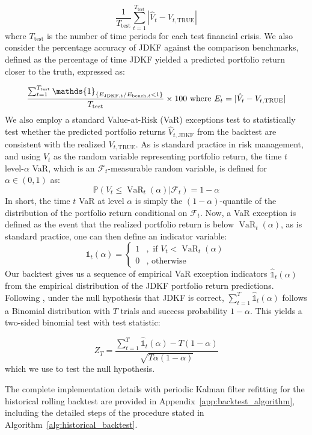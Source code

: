 \documentclass[11pt]{article}
\theoremstyle{plain}
\theoremstyle{definition}
\theoremstyle{remark}
\numberwithin{equation}{section}
\begin{document}
\[\frac{1}{T_{\text{test}}}\sum_{t=1}^{T_{\text{test}}} |\hat{V}_t-V_{t, \mathrm{TRUE}}| \]
where $T_{\text{test}}$ is the number of time periods for each test financial crisis. We also consider the percentage accuracy of JDKF against the comparison benchmarks, defined as the percentage of time JDKF yielded a predicted portfolio return closer to the truth, expressed as:

\[\frac{\sum_{t=1}^{T_{\text{test}}} \mathds{1}_{\{E_{\mathrm{JDKF}, t}/E_{\text{bench}, t}<1 \}}}{T_{\text{test}}} \times 100 \\ \textrm{ where } E_t=|\hat{V}_t-V_{t, \mathrm{TRUE}}|\]
We also employ a standard Value-at-Risk (VaR) exceptions test to statistically test whether the predicted portfolio returns $\hat{V}_{t, \mathrm{JDKF}}$ from the backtest are consistent with the realized $V_{t, \mathrm{TRUE}}$. As is standard practice in risk management, and using $V_t$ as the random variable representing portfolio return, the time $t$ level-$\alpha$ VaR, which is an $\mathcal{F}_t$-measurable random variable, is defined for $\alpha \in (0,1)$ as:
\[\mathbb{P}(V_t \leq \operatorname{VaR}_t(\alpha)|\mathcal{F}_t)=1-\alpha\]
In short, the time $t$ VaR at level $\alpha$ is simply the $(1-\alpha)$-quantile of the distribution of the portfolio return conditional on $\mathcal{F}_t$. Now, a VaR exception is defined as the event that the realized portfolio return is below $\operatorname{VaR}_t(\alpha)$, as is standard practice, one can then define an indicator variable:
\[\mathds{1}_t(\alpha)= \begin{cases} 1 &, \text{ if } V_t <\operatorname{VaR}_t(\alpha) \\ 0 & , \text{ otherwise }\end{cases}\]
Our backtest gives us a sequence of empirical VaR exception indicators $\hat{\mathds{1}}_t(\alpha)$ from the empirical distribution of the JDKF portfolio return predictions. Following \citet{kupiec1995}, under the null hypothesis that JDKF is correct, $\sum_{t=1}^T \hat{\mathds{1}}_t(\alpha)$ follows a Binomial distribution with $T$ trials and success probability $1-\alpha$. This yields a two-sided binomial test  with test statistic:

\[Z_T=\frac{\sum_{t=1}^T \hat{\mathds{1}}_t(\alpha)-T(1-\alpha)}{\sqrt{T \alpha (1-\alpha)}}\]
which we use to test the null hypothesis.

The complete implementation details with periodic Kalman filter refitting for the historical rolling backtest are provided in Appendix~\ref{app:backtest_algorithm}, including the detailed steps of the procedure stated in Algorithm~\ref{alg:historical_backtest}.
\end{document}
